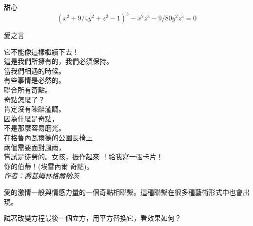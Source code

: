 \begin{surferPage}{甜心}
\[(x^2+ 9/4y^2	+ z^2- 1)^3- x^2z^3	- 9/80y^2z^3	= 0\]

\singlespacing
 愛之言
\singlespacing

它不能像這樣繼續下去！\\
這是我們所擁有的，我們必須保持。\\
當我們相遇的時候。\\
有些事情是必然的。\\
聯合所有奇點。\\
奇點怎麼了？\\
肯定沒有陳辭濫調。\\
因為什麼是奇點，\\
不是那麼容易磨光。\\
在格魯內瓦爾德的公園長椅上\\
兩個需要面對風雨，\\
嘗試是徒勞的。女孩，振作起來 ！給我寫一張卡片！\\
你的伯蒂！(埃雷內爾 奇點)。\\
\textit{作者：喬基姆林格爾納茨}

\singlespacing 
愛的激情一般與情感力量的一個奇點相聯繫。這種聯繫在很多種藝術形式中也會出現。

\singlespacing 
試著改變方程最後一個立方，用平方替換它，看效果如何？
\end{surferPage}
